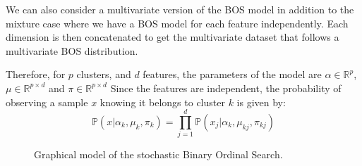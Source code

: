 We can also consider a multivariate version of the BOS model in addition to the mixture case where we have a BOS model for each feature independently. Each dimension is then concatenated to get the multivariate dataset that follows a multivariate BOS distribution.

Therefore, for $p$ clusters, and $d$ features, the parameters of the model are $\alpha \in \mathbb{R}^p$, $\mu \in \mathbb{R}^{p\times d}$ and $\pi \in \mathbb{R}^{p\times d}$
Since the features are independent, the probability of observing a sample $x$ knowing it belongs to cluster $k$ is given by:
\begin{equation}
    \mathbb{P}(x | \alpha_k, \mu_{k}, \pi_k) = \prod_{j=1}^d \mathbb{P}(x_j | \alpha_k, \mu_{kj}, \pi_{kj})
\end{equation}

\begin{figure}[htbp]
\centering
\begin{adjustbox}{width=\textwidth}
\end{adjustbox}
\caption{Graphical model of the stochastic Binary Ordinal Search.}
\label{fig:graphical_model}
\end{figure}

